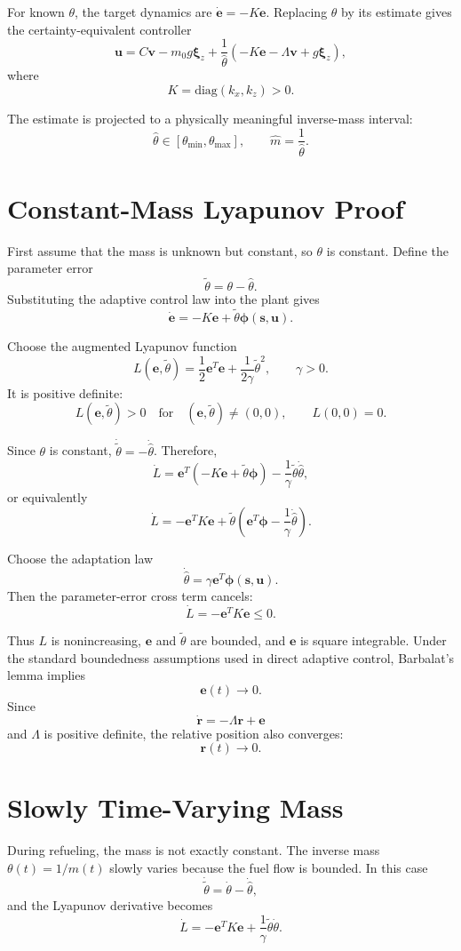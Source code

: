 \documentclass[11pt,a4paper]{article}
\begin{document}
For known $\theta$, the target dynamics are $\dot{\bm e}=-K\bm e$.
Replacing $\theta$ by its estimate gives the certainty-equivalent controller
\[
\bm u
=
C\bm v-m_0g\bm\xi_z
+
\frac{1}{\hat\theta}
\left(
-K\bm e-\Lambda\bm v+g\bm\xi_z
\right),
\]
where
\[
K=\mathrm{diag}(k_x,k_z)>0.
\]

The estimate is projected to a physically meaningful inverse-mass interval:
\[
\hat\theta\in[\theta_{\min},\theta_{\max}],
\qquad
\hat m=\frac{1}{\hat\theta}.
\]

\section{Constant-Mass Lyapunov Proof}

First assume that the mass is unknown but constant, so $\theta$ is constant.
Define the parameter error
\[
\tilde\theta=\theta-\hat\theta.
\]
Substituting the adaptive control law into the plant gives
\[
\dot{\bm e}
=
-K\bm e+\tilde\theta\bm\phi(\bm s,\bm u).
\]

Choose the augmented Lyapunov function
\[
L(\bm e,\tilde\theta)
=
\frac{1}{2}\bm e^T\bm e
+
\frac{1}{2\gamma}\tilde\theta^2,
\qquad
\gamma>0.
\]
It is positive definite:
\[
L(\bm e,\tilde\theta)>0
\quad\text{for}\quad
(\bm e,\tilde\theta)\ne(0,0),
\qquad
L(0,0)=0.
\]

Since $\theta$ is constant,
$\dot{\tilde\theta}=-\dot{\hat\theta}$. Therefore,
\[
\dot L
=
\bm e^T(-K\bm e+\tilde\theta\bm\phi)
-
\frac{1}{\gamma}\tilde\theta\dot{\hat\theta},
\]
or equivalently
\[
\dot L
=
-\bm e^TK\bm e
+
\tilde\theta
\left(
\bm e^T\bm\phi
-
\frac{1}{\gamma}\dot{\hat\theta}
\right).
\]

Choose the adaptation law
\[
\dot{\hat\theta}
=
\gamma\bm e^T\bm\phi(\bm s,\bm u).
\]
Then the parameter-error cross term cancels:
\[
\dot L
=
-\bm e^TK\bm e
\le 0.
\]

Thus $L$ is nonincreasing, $\bm e$ and $\tilde\theta$ are bounded, and
$\bm e$ is square integrable. Under the standard boundedness assumptions used
in direct adaptive control, Barbalat's lemma implies
\[
\bm e(t)\to0.
\]
Since
\[
\dot{\bm r}
=
-\Lambda\bm r+\bm e
\]
and $\Lambda$ is positive definite, the relative position also converges:
\[
\bm r(t)\to0.
\]

\section{Slowly Time-Varying Mass}

During refueling, the mass is not exactly constant. The inverse mass
$\theta(t)=1/m(t)$ slowly varies because the fuel flow is bounded. In this
case
\[
\dot{\tilde\theta}
=
\dot\theta-\dot{\hat\theta},
\]
and the Lyapunov derivative becomes
\[
\dot L
=
-\bm e^TK\bm e
+
\frac{1}{\gamma}\tilde\theta\dot\theta.
\]
\end{document}
